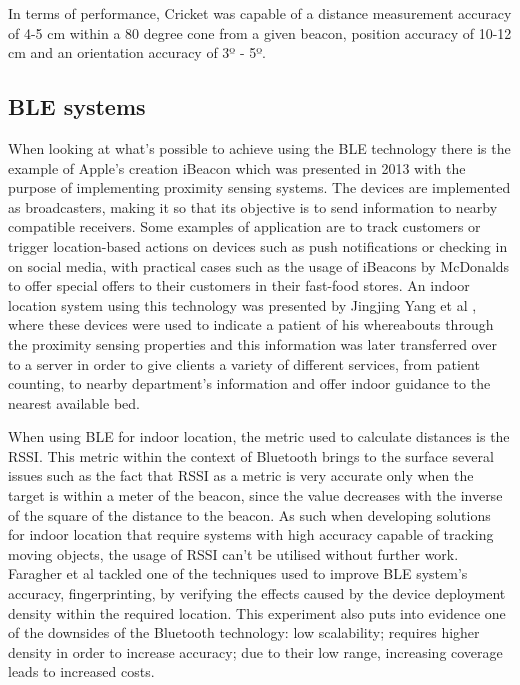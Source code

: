   
In terms of performance, Cricket was capable of a distance measurement accuracy of 4-5 cm within a 80 degree cone from a given beacon, position accuracy of 10-12 cm and an orientation accuracy of 3º - 5º.  
  
  
\subsection{BLE systems}  
\label{subsec:ble}  
When looking at what's possible to achieve using the BLE technology there is the example of Apple's creation iBeacon \cite{ibeacon} which was presented in 2013 with the purpose of implementing proximity sensing systems. The devices are implemented as broadcasters, making it so that its objective is to send information to nearby compatible receivers. Some examples of application are to track customers or trigger location-based actions on devices such as push notifications or checking in on social media, with practical cases such as the usage of iBeacons by McDonalds to offer special offers to their customers in their fast-food stores. An indoor location system using this technology was presented by Jingjing Yang et al \cite{ibeacon1}, where these devices were used to indicate a patient of his whereabouts through the proximity sensing properties and this information was later transferred over to a server in order to give clients a variety of different services, from patient counting, to nearby department's information and offer indoor guidance to the nearest available bed.   
  
  
When using BLE for indoor location, the metric used to calculate distances is the RSSI. This metric within the context of Bluetooth brings to the surface several issues such as the fact that RSSI as a metric is very accurate only when the target is within a meter of the beacon, since the value decreases with the inverse of the square of the distance to the beacon. As such when developing solutions for indoor location that require systems with high accuracy capable of tracking moving objects, the usage of RSSI can't be utilised without further work. Faragher et al \cite{bleacc} tackled one of the techniques used to improve BLE system's accuracy, fingerprinting, by verifying the effects caused by the device deployment density within the required location. This experiment also puts into evidence one of the downsides of the Bluetooth technology: low scalability; requires higher density in order to increase accuracy; due to their low range, increasing coverage leads to increased costs.  
  
